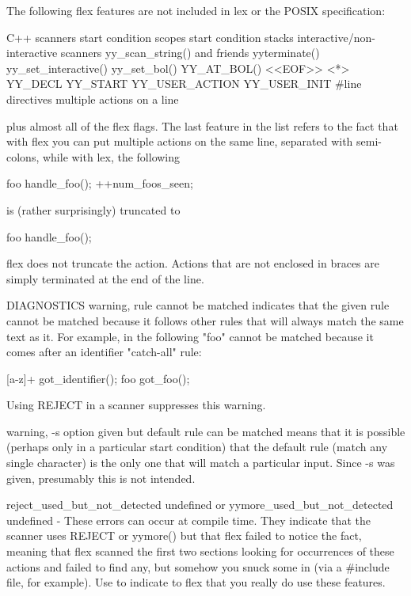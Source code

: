 \documentclass[12pt,spanish,twocolumn,lettersize]{article}
\begin{document}
{       The following flex features are not included in lex or the
       POSIX specification:

	   C++ scanners
	   start condition scopes
	   start condition stacks
	   interactive/non-interactive scanners
	   yy_scan_string() and friends
	   yyterminate()
	   yy_set_interactive()
	   yy_set_bol()
	   YY_AT_BOL()
	   <<EOF>>
	   <*>
	   YY_DECL
	   YY_START
	   YY_USER_ACTION
	   YY_USER_INIT
	   #line directives
	   multiple actions on a line

       plus almost all of the flex flags.  The	last  feature  in
       the  list  refers  to  the fact that with flex you can put
       multiple actions on the same line,  separated  with  semi-
       colons, while with lex, the following

	   foo	  handle_foo(); ++num_foos_seen;

       is (rather surprisingly) truncated to

	   foo	  handle_foo();

       flex  does  not truncate the action.  Actions that are not
       enclosed in braces are simply terminated at the end of the
       line.

DIAGNOSTICS
       warning,	 rule  cannot be matched indicates that the given
       rule cannot be matched because it follows other rules that
       will  always  match  the same text as it.  For example, in
       the following "foo" cannot be  matched  because	it  comes
       after an identifier "catch-all" rule:

	   [a-z]+    got_identifier();
	   foo	     got_foo();

       Using REJECT in a scanner suppresses this warning.

       warning,	 -s  option given but default rule can be matched
       means that it is possible (perhaps only	in  a  particular
       start  condition)  that the default rule (match any single
       character) is the only one that will  match  a  particular
       input.	Since  -s  was	given,	presumably  this  is  not
       intended.

       reject_used_but_not_detected	    undefined	       or
       yymore_used_but_not_detected  undefined - These errors can
       occur at compile time.  They  indicate  that  the  scanner
       uses REJECT or yymore() but that flex failed to notice the
       fact, meaning that flex scanned	the  first  two	 sections
       looking	for  occurrences  of  these actions and failed to
       find any, but somehow you snuck some in	(via  a	 #include
       file,  for example).  Use %
       to indicate to flex that you really do use these features.

}
\end{document}
